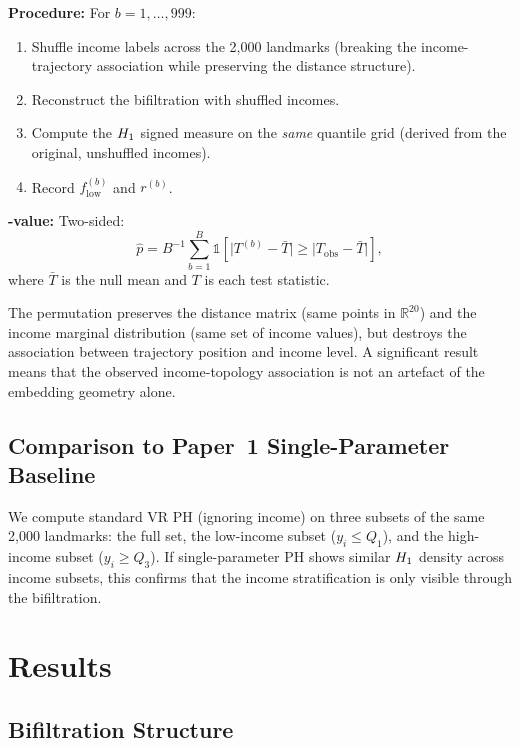 \textbf{Procedure:} For $b = 1, \ldots, 999$:
\begin{enumerate}
  \item Shuffle income labels across the 2,000 landmarks (breaking the
    income-trajectory association while preserving the distance structure).
  \item Reconstruct the bifiltration with shuffled incomes.
  \item Compute the $H_{1}$ signed measure on the \emph{same} quantile grid
    (derived from the original, unshuffled incomes).
  \item Record $f_\text{low}^{(b)}$ and $r^{(b)}$.
\end{enumerate}

\textbf{\pval-value:} Two-sided:
\begin{equation}
  \hat{p} = B^{-1} \sum_{b=1}^{B}
  \mathbb{1}\!\left[
    \bigl|T^{(b)} - \bar{T}\bigr|
    \geq \bigl|T_\text{obs} - \bar{T}\bigr|
  \right],
  \label{eq:pvalue}
\end{equation}
where $\bar{T}$ is the null mean and $T$ is each test statistic.

The permutation preserves the distance matrix (same points in
$\mathbb{R}^{20}$) and the income marginal distribution (same set of income
values), but destroys the association between trajectory position and income
level. A significant result means that the observed income-topology
association is not an artefact of the embedding geometry alone.

\subsection{Comparison to Paper~1 Single-Parameter Baseline}

We compute standard VR PH (ignoring income) on three subsets of the same
2,000 landmarks: the full set, the low-income subset ($y_i \leq Q_1$), and
the high-income subset ($y_i \geq Q_3$). If single-parameter PH shows
similar $H_{1}$ density across income subsets, this confirms that the income
stratification is only visible through the bifiltration.

\section{Results}
\label{sec:results}

\subsection{Bifiltration Structure}

